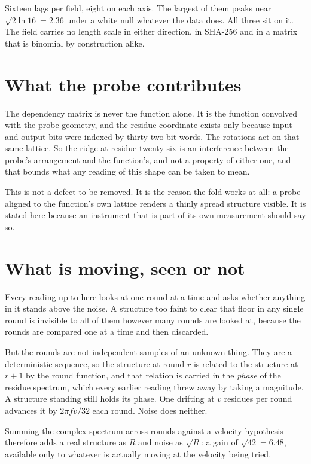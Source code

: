 Sixteen lags per field, eight on each axis. The largest of them peaks near
\(\sqrt{2 \ln 16} = 2.36\) under a white null whatever the data does. All three sit on it. The
field carries no length scale in either direction, in SHA-256 and in a matrix that is binomial by
construction alike.

\section{What the probe contributes}

The dependency matrix is never the function alone. It is the function convolved with the probe
geometry, and the residue coordinate exists only because input and output bits were indexed by
thirty-two bit words. The rotations act on that same lattice. So the ridge at residue twenty-six is
an interference between the probe's arrangement and the function's, and not a property of
either one, and that bounds what any reading of this shape can be taken to mean.

This is not a defect to be removed. It is the reason the fold works at all: a probe aligned to the
function's own lattice renders a thinly spread structure visible. It is stated here because
an instrument that is part of its own measurement should say so.

\section{What is moving, seen or not}

Every reading up to here looks at one round at a time and asks whether anything in it stands above
the noise. A structure too faint to clear that floor in any single round is invisible to all of
them however many rounds are looked at, because the rounds are compared one at a time and then
discarded.

But the rounds are not independent samples of an unknown thing. They are a deterministic sequence,
so the structure at round \(r\) is related to the structure at \(r+1\) by the round function, and
that relation is carried in the \emph{phase} of the residue spectrum, which every earlier
reading threw away by taking a magnitude. A structure standing still holds its phase. One drifting
at \(v\) residues per round advances it by \(2\pi f v / 32\) each round. Noise does neither.

Summing the complex spectrum across rounds against a velocity hypothesis therefore adds a real
structure as \(R\) and noise as \(\sqrt{R}\): a gain of \(\sqrt{42} = 6.48\), available only to
whatever is actually moving at the velocity being tried.

